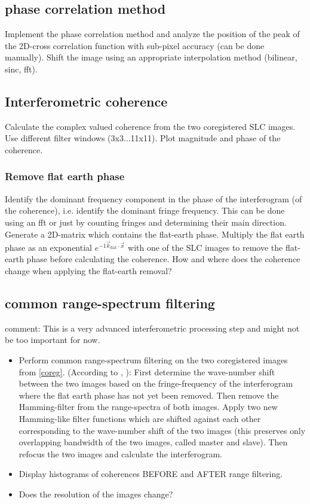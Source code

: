\subsection{phase correlation method}
Implement the phase correlation method \cite{zitova04} and analyze the position of the peak of the 2D-cross correlation function with sub-pixel accuracy (can be done manually). Shift the image using an appropriate interpolation method (bilinear, sinc, fft).

\subsection{Interferometric coherence}
Calculate the complex valued coherence from the two coregistered SLC images. Use different filter windows (3x3...11x11). Plot magnitude and phase of the coherence.

\subsubsection{Remove flat earth phase}
Identify the dominant frequency component in the phase of the interferogram (of the coherence), i.e. identify the dominant fringe frequency. This can be done using an fft or just by counting fringes and determining their main direction. Generate a 2D-matrix which contains the flat-earth phase. Multiply the flat earth phase as an exponential $e^{-1\vec{k}_\text{flat} \cdot \vec x}$ with one of the SLC images to remove the flat-earth phase before calculating the coherence. How and where does the coherence change when applying the flat-earth removal? 

\subsection{common range-spectrum filtering}
comment: This is a very advanced interferometric processing step and might not be too important for now.
\begin{itemize}
\item Perform common range-spectrum filtering on the two coregistered images from \ref{coreg}. (According to \cite{gatelli94}, \cite{zebker92}): First determine the wave-number shift between the two images based on the fringe-frequency of the interferogram where the flat earth phase has not yet been removed. Then remove the Hamming-filter from the range-spectra of both images. Apply two new Hamming-like filter functions which are shifted against each other corresponding to the wave-number shift of the two images (this preserves only overlapping bandwidth of the two images, called master and slave). Then refocus the two images and calculate the interferogram. 
\item Display histograms of coherences BEFORE and AFTER range filtering.
\item Does the resolution of the images change?
\end{itemize}

